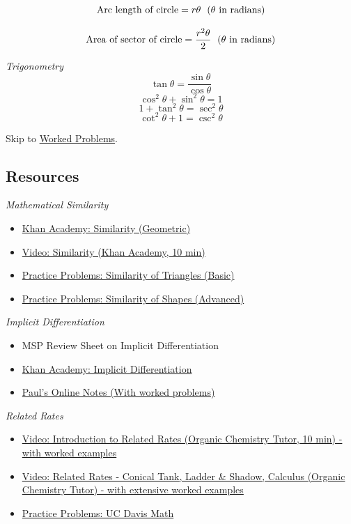 \documentclass{article}
\begin{document}
$$\text{Arc length of circle} = r\theta \text{ \hspace{3pt}($\theta$ in radians)}$$

$$\text{Area of sector of circle} = \frac{r^2\theta}{2} \text{ \hspace{3pt}($\theta$ in radians)}$$

\noindent\textit{Trigonometry}
$$\tan \theta = \frac{\sin \theta}{\cos \theta}$$
$$\cos^2\theta + \sin^2\theta = 1$$
$$1 + \tan^2\theta = \sec^2\theta$$
$$\cot^2\theta + 1 = \csc^2\theta$$

\noindent Skip to \hyperref[WorkedProblems]{Worked Problems}.

\subsection*{Resources}

\textit{Mathematical Similarity}
\begin{itemize}
    \item \href{https://www.khanacademy.org/math/geometry-home/similarity}{Khan Academy: Similarity (Geometric)}
    \item \href{https://www.youtube.com/watch?v=BI-rtfZVXy0}{Video: Similarity (Khan Academy, 10 min)}
    \item \href{https://mathbitsnotebook.com/Geometry/Similarity/SMSimilarPractice.html}{Practice Problems: Similarity of Triangles (Basic)}
    \item \href{https://cdn.kutasoftware.com/Worksheets/PreAlg/Similar%20Figures.pdf}{Practice Problems: Similarity of Shapes (Advanced)}
\end{itemize}


\noindent\textit{Implicit Differentiation}
\begin{itemize}
    \item MSP Review Sheet on Implicit Differentiation
    \item \href{https://www.khanacademy.org/math/ap-calculus-ab/ab-differentiation-2-new/ab-3-2/a/implicit-differentiation-review#:~:text=In%20implicit%20differentiation%2C%20we%20differentiate,2%20%3D%201%20%E2%80%8D%20for%20example.}{Khan Academy: Implicit Differentiation}
    \item \href{https://tutorial.math.lamar.edu/classes/calci/implicitdiff.aspx}{Paul's Online Notes (With worked problems)}
\end{itemize}

\noindent\textit{Related Rates}
\begin{itemize}
    \item \href{https://youtu.be/I9mVUo-bhM8}{Video: Introduction to Related Rates (Organic Chemistry Tutor, 10 min) - with worked examples} 
    \item \href{https://youtu.be/ps-r4nti5Go}{Video: Related Rates - Conical Tank, Ladder \& Shadow, Calculus (Organic Chemistry Tutor) - with extensive worked examples}
    \item \href{https://www.math.ucdavis.edu/~kouba/CalcOneDIRECTORY/relatedratesdirectory/RelatedRates.html}{Practice Problems: UC Davis Math}
\end{itemize}
\end{document}
